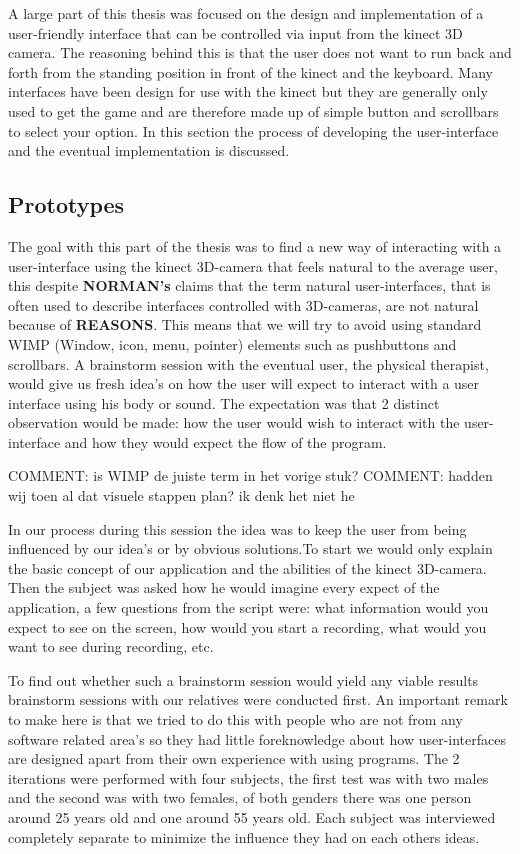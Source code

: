 A large part of this thesis was focused on the design and implementation of a user-friendly interface that can be controlled via input from the kinect 3D camera. The reasoning behind this is that the user does not want to run back and forth from the standing position in front of the kinect and the keyboard. Many interfaces have been design for use with the kinect but they are generally only used to get the game and are therefore made up of simple button and scrollbars to select your option. In this section the process of developing the user-interface and the eventual implementation is discussed.

\subsection{Prototypes}

The goal with this part of the thesis was to find a new way of interacting with a user-interface using the kinect 3D-camera that feels natural to the average user, this despite  \textbf{NORMAN's} claims that the  term natural user-interfaces, that is often used to describe interfaces controlled with 3D-cameras, are not natural because  of \textbf{REASONS}. This means that we will try to avoid using standard WIMP (Window, icon, menu, pointer) elements such as pushbuttons and scrollbars. A brainstorm session with the eventual user, the physical therapist, would give us fresh idea's on how the user will expect to interact with a user interface using his body or sound. The expectation was that 2 distinct observation would be made: how the user would wish to interact with the user-interface and how they would expect the flow of the program. 

 {\large COMMENT: is WIMP de juiste term in het vorige stuk? }
 {\large COMMENT: hadden wij toen al dat visuele stappen plan? ik denk het niet he }

In our process during this session the idea was to keep the user from being influenced by our idea's or by obvious solutions.To start we would only explain the basic concept of our application and the abilities of the kinect 3D-camera. Then the subject was asked how he would imagine every expect of the application, a few questions from the script were: what information would you expect to see on the screen, how would you start a recording, what would you want to see during recording, etc. 

To find out whether such a brainstorm session would yield any viable results brainstorm sessions with our relatives were conducted first. An important remark to make here is that we tried to do this with people who are not from any software related area's so they had little foreknowledge about how user-interfaces are designed apart from their own experience with using programs. The 2 iterations were performed with four subjects, the first test was with two males and the second was with two females, of both genders there was one person around 25 years old and one around 55 years old. Each subject was interviewed completely separate to minimize the influence they had on each others ideas.

